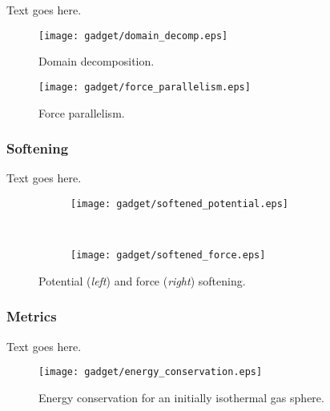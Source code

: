 Text goes here.

\begin{figure}[t]
	\centering
	\texttt{[image: gadget/domain\_decomp.eps]}
	\caption[Domain decomposition.]{Domain decomposition.}
	\label{fig:gadget--domain_decomp}
\end{figure}

\begin{figure}[t]
	\centering
	\texttt{[image: gadget/force\_parallelism.eps]}
	\caption[Force parallelism.]{Force parallelism.}
	\label{fig:gadget--force_parallelism}
\end{figure}



\subsubsection{Softening}
\label{subsubsec:gadget--gadget--softening}


Text goes here.

\begin{figure}[t]
	\centering
	\begin{subfigure}{}
		\texttt{[image: gadget/softened\_potential.eps]}
	\end{subfigure}
	~
	\begin{subfigure}{}
		\texttt{[image: gadget/softened\_force.eps]}
	\end{subfigure}
	\caption[Potential and force softening.]{Potential (\emph{left}) and force (\emph{right}) softening.}
	\label{fig:gadget--softening}
\end{figure}



\subsubsection{Metrics}
\label{subsubsec:gadget--gadget--metrics}


Text goes here.

\begin{figure}[t]
	\centering
	\texttt{[image: gadget/energy\_conservation.eps]}
	\caption[Energy conservation for an initially isothermal gas sphere.]{Energy conservation for an initially isothermal gas sphere.}
	\label{fig:gadget--force_parallelism}
\end{figure}




